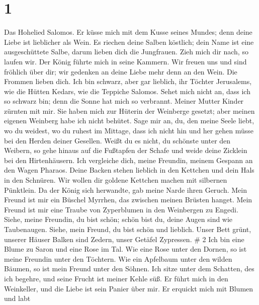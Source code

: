 \hypertarget{section}{%
\section{1}\label{section}}

 Das Hohelied Salomos.  Er küsse mich mit dem
Kusse seines Mundes; denn deine Liebe ist lieblicher als Wein.
 Es riechen deine Salben köstlich; dein Name ist eine
ausgeschüttete Salbe, darum lieben dich die Jungfrauen. 
Zieh mich dir nach, so laufen wir. Der König führte mich in seine
Kammern. Wir freuen uns und sind fröhlich über dir; wir gedenken an
deine Liebe mehr denn an den Wein. Die Frommen lieben dich. 
Ich bin schwarz, aber gar lieblich, ihr Töchter Jerusalems, wie die
Hütten Kedars, wie die Teppiche Salomos.  Sehet mich nicht
an, dass ich so schwarz bin; denn die Sonne hat mich so verbrannt.
Meiner Mutter Kinder zürnten mit mir. Sie haben mich zur Hüterin der
Weinberge gesetzt; aber meinen eigenen Weinberg habe ich nicht behütet.
 Sage mir an, du, den meine Seele liebt, wo du weidest, wo
du ruhest im Mittage, dass ich nicht hin und her gehen müsse bei den
Herden deiner Gesellen.  Weißt du es nicht, du schönste
unter den Weibern, so gehe hinaus auf die Fußtapfen der Schafe und weide
deine Zicklein bei den Hirtenhäusern.  Ich vergleiche dich,
meine Freundin, meinem Gespann an den Wagen Pharaos.  Deine
Backen stehen lieblich in den Kettchen und dein Hals in den Schnüren.
 Wir wollen dir goldene Kettchen machen mit silbernen
Pünktlein.  Da der König sich herwandte, gab meine Narde
ihren Geruch.  Mein Freund ist mir ein Büschel Myrrhen, das
zwischen meinen Brüsten hanget.  Mein Freund ist mir eine
Traube von Zyperblumen in den Weinbergen zu Engedi.  Siehe,
meine Freundin, du bist schön; schön bist du, deine Augen sind wie
Taubenaugen.  Siehe, mein Freund, du bist schön und
lieblich. Unser Bett grünt,  unserer Häuser Balken sind
Zedern, unser Getäfel Zypressen. \# 2  Ich bin eine Blume zu
Saron und eine Rose im Tal.  Wie eine Rose unter den Dornen,
so ist meine Freundin unter den Töchtern.  Wie ein Apfelbaum
unter den wilden Bäumen, so ist mein Freund unter den Söhnen. Ich sitze
unter dem Schatten, des ich begehre, und seine Frucht ist meiner Kehle
süß.  Er führt mich in den Weinkeller, und die Liebe ist
sein Panier über mir.  Er erquickt mich mit Blumen und labt
